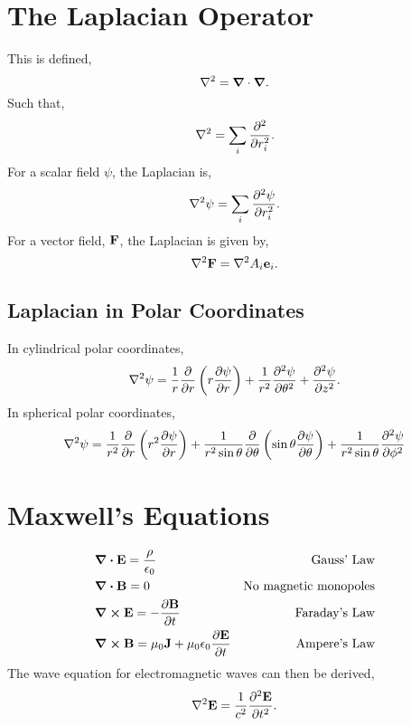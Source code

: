 \documentclass{book}
\begin{document}
\section{The Laplacian Operator}
This is defined,
\begin{equation}
    \nabla^2 = \grad \cdot \grad.
\end{equation}
Such that,
\begin{equation}
    \nabla^2 = \sum_i \pdv[2]{}{r_i}.
\end{equation}
For a scalar field $\psi$, the Laplacian is,
\begin{equation}
    \nabla^2\psi = \sum_i\pdv[2]{\psi}{r_i}.
\end{equation}
For a vector field, $\vb{F}$, the Laplacian is given by,
\begin{equation}
    \nabla^2\vb{F} = \nabla^2A_i\vb{e}_i.
\end{equation}
\subsection{Laplacian in Polar Coordinates}
In cylindrical polar coordinates,
\begin{equation}
    \nabla^2\psi = \frac{1}{r}\pdv{}{r}\left(r\pdv{\psi}{r}\right) + \frac{1}{r^2}\pdv[2]{\psi}{\theta} + \pdv[2]{\psi}{z}.
\end{equation}
In spherical polar coordinates,
\begin{equation}
    \nabla^2\psi = \frac{1}{r^2}\pdv{}{r}\left(r^2\pdv{\psi}{r}\right) + \frac{1}{r^2\sin\theta}\pdv{}{\theta}\left(\sin\theta\pdv{\psi}{\theta}\right)+\frac{1}{r^2\sin\theta}\pdv[2]{\psi}{\phi}
\end{equation}

\section{Maxwell's Equations}
\begin{align}
    & \div{\vb{E}} = \frac{\rho}{\epsilon_0} & \text{Gauss' Law}&\\
    & \div{\vb{B}} = 0 & \text{No magnetic monopoles}&\\
    & \curl{\vb{E}} = -\pdv{\vb{B}}{t} & \text{Faraday's Law}&\\
    &\curl{\vb{B}} = \mu_0\vb{J} + \mu_0\epsilon_0\pdv{\vb{E}}{t} & \text{Ampere's Law}&
\end{align}
The wave equation for electromagnetic waves can then be derived,
\begin{equation}
    \nabla^2\vb{E} = \frac{1}{c^2}\pdv[2]{\vb{E}}{t}.
\end{equation}
\end{document}
